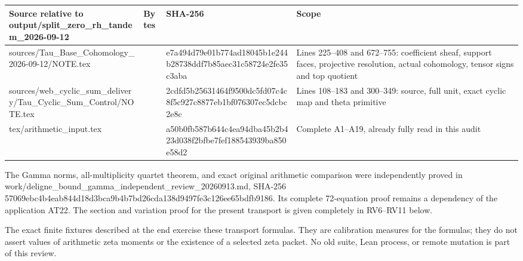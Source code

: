 {\def\LTcaptype{none} %
\begin{longtable}[]{@{}
  >{\raggedright\arraybackslash}p{}
  >{\raggedleft\arraybackslash}p{}
  >{\raggedright\arraybackslash}p{}
  >{\raggedright\arraybackslash}p{}@{}}
\toprule\noalign{}
\begin{minipage}[b]{\linewidth}\raggedright
Source relative to output/split\_zero\_rh\_tandem\_2026-09-12
\end{minipage} & \begin{minipage}[b]{\linewidth}\raggedleft
Bytes
\end{minipage} & \begin{minipage}[b]{\linewidth}\raggedright
SHA-256
\end{minipage} & \begin{minipage}[b]{\linewidth}\raggedright
Scope
\end{minipage} \\
\midrule\noalign{}
\endhead
\bottomrule\noalign{}
\endlastfoot
sources/Tau\_Base\_Cohomology\_2026-09-12/NOTE.tex & 28353 & e7a494d79e01b774ad18045b1e244b28738ddf7b85aec31c58724e2fe35c3aba & Lines 225--408 and 672--755: coefficient sheaf, support faces, projective resolution, actual cohomology, tensor signs and top quotient \\
sources/web\_cyclic\_sum\_delivery/Tau\_Cyclic\_Sum\_Control/NOTE.tex & 41804 & 2cdfd5b25631464f9500dc5fd07c4c8f5c927c8877eb1bf076307ec5dcbc2e8c & Lines 108--183 and 300--349: source, full unit, exact cyclic map and theta primitive \\
tex/arithmetic\_input.tex & 14644 & a50b0fb587b644c4ea94dba45b2b423d038f2bfbe7fef188543939ba850e58d2 & Complete A1--A19, already fully read in this audit \\
\end{longtable}
}

The Gamma norms, all-multiplicity quartet theorem, and exact original arithmetic comparison were independently proved in work/deligne\_bound\_gamma\_independent\_review\_20260913.md, SHA-256 57069ebc4b4eab844d18d3bca9b4b7bd26cda138d9497fe3c126ee65bdfb9186. Its complete 72-equation proof remains a dependency of the application AT22. The section and variation proof for the present transport is given completely in RV6--RV11 below.

The exact finite fixtures described at the end exercise these transport formulas. They are calibration measures for the formulas; they do not assert values of arithmetic zeta moments or the existence of a selected zeta packet. No old suite, Lean process, or remote mutation is part of this review.

